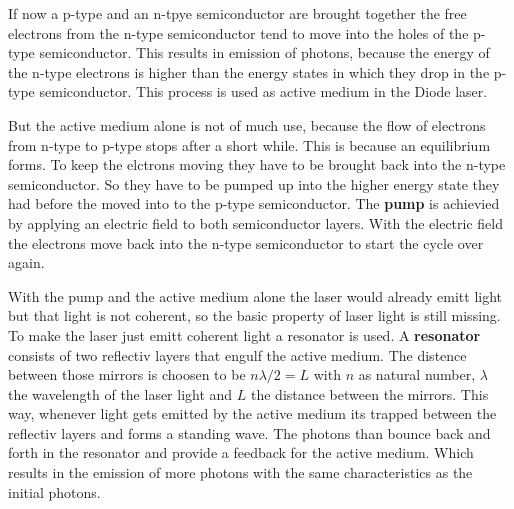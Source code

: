 If now a p-type and an n-tpye semiconductor are brought together the free electrons from the n-type semiconductor tend to move into the holes of the p-type semiconductor.
This results in emission of photons, because the energy of the n-type electrons is higher than the energy states in which they drop in the p-type semiconductor.
This process is used as active medium in the Diode laser.

But the active medium alone is not of much use, because the flow of electrons from n-type to p-type stops after a short while.
This is because an equilibrium forms.
To keep the elctrons moving they have to be brought back into the n-type semiconductor.
So they have to be pumped up into the higher energy state they had before the moved into to the p-type semiconductor.
The \textbf{pump} is achievied by applying an electric field to both semiconductor layers.
With the electric field the electrons move back into the n-type semiconductor to start the cycle over again.

With the pump and the active medium alone the laser would already emitt light but that light is not coherent, so the basic property of laser light is still missing.
To make the laser just emitt coherent light a resonator is used.
A \textbf{resonator} consists of two reflectiv layers that engulf the active medium.
The distence between those mirrors is choosen to be $n \lambda/2 = L$ with $n$ as natural number, $\lambda$ the wavelength of the laser light and $L$ the distance between the mirrors.
This way, whenever light gets emitted by the active medium its trapped between the reflectiv layers and forms a standing wave.
The photons than bounce back and forth in the resonator and provide a feedback for the active medium.
Which results in the emission of more photons with the same characteristics as the initial photons.

